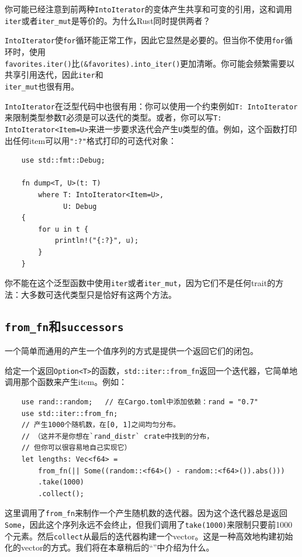 你可能已经注意到前两种\texttt{IntoIterator}的变体产生共享和可变的引用，这和调用\texttt{iter}或者\texttt{iter\_mut}是等价的。为什么Rust同时提供两者？

\texttt{IntoIterator}使\texttt{for}循环能正常工作，因此它显然是必要的。但当你不使用\texttt{for}循环时，使用\\
\texttt{favorites.iter()}比\texttt{(\&favorites).into\_iter()}更加清晰。你可能会频繁需要以共享引用迭代，因此\texttt{iter}和\\
\texttt{iter\_mut}也很有用。

\texttt{IntoIterator}在泛型代码中也很有用：你可以使用一个约束例如\texttt{T: IntoIterator}来限制类型参数\texttt{T}必须是可以迭代的类型。或者，你可以写\texttt{T: IntoIterator<Item=U>}来进一步要求迭代会产生\texttt{U}类型的值。例如，这个函数打印出任何item可以用\texttt{"{:?}"}格式打印的可迭代对象：
\begin{verbatim}
    use std::fmt::Debug;

    fn dump<T, U>(t: T)
        where T: IntoIterator<Item=U>,
              U: Debug
    {
        for u in t {
            println!("{:?}", u);
        }
    }
\end{verbatim}
你不能在这个泛型函数中使用\texttt{iter}或者\texttt{iter\_mut}，因为它们不是任何trait的方法：大多数可迭代类型只是恰好有这两个方法。

\subsection{\texttt{from\_fn}和\texttt{successors}}

一个简单而通用的产生一个值序列的方式是提供一个返回它们的闭包。

给定一个返回\texttt{Option<T>}的函数，\texttt{std::iter::from\_fn}返回一个迭代器，它简单地调用那个函数来产生item。例如：
\begin{verbatim}
    use rand::random;   // 在Cargo.toml中添加依赖：rand = "0.7"
    use std::iter::from_fn;
    // 产生1000个随机数，在[0, 1]之间均匀分布。
    // （这并不是你想在`rand_distr` crate中找到的分布，
    // 但你可以很容易地自己实现它）
    let lengths: Vec<f64> =
        from_fn(|| Some((random::<f64>() - random::<f64>()).abs()))
        .take(1000)
        .collect();
\end{verbatim}

这里调用了\texttt{from\_fn}来制作一个产生随机数的迭代器。因为这个迭代器总是返回\texttt{Some}，因此这个序列永远不会终止，但我们调用了\texttt{take(1000)}来限制只要前1000个元素。然后\texttt{collect}从最后的迭代器构建一个vector。这是一种高效地构建初始化的vector的方式。我们将在本章稍后的“”中介绍为什么。

